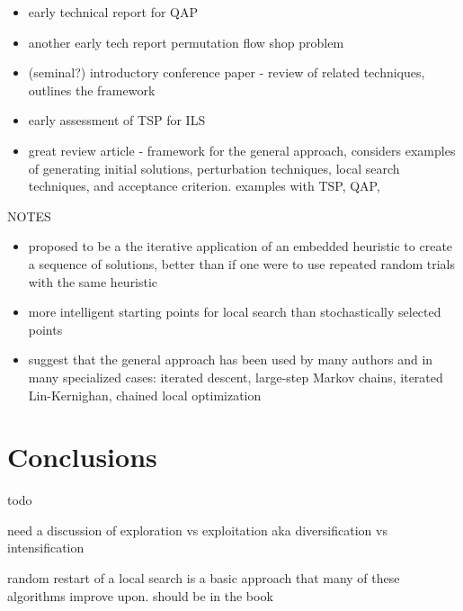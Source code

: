 \documentclass[a4paper, 11pt]{article}
\begin{document}
\begin{itemize}
	\item early technical report \cite{Stuetzle1999} for QAP
	\item another early tech report \cite{Stutzle1998a} permutation flow shop problem
	\item (seminal?) introductory conference paper \cite{Lourenco2001} - review of related techniques, outlines the framework

	\item early assessment of TSP for ILS \cite{Stutzle1999}
\end{itemize}

\begin{itemize}
	\item great review article \cite{Ramalhinho-Lourenco2003} - framework for the general approach, considers examples of generating initial solutions, perturbation techniques, local search techniques, and acceptance criterion. examples with TSP, QAP, 
\end{itemize}

NOTES
\begin{itemize}
	\item proposed to be a the iterative application of an embedded heuristic to create a sequence of solutions, better than if one were to use repeated random trials with the same heuristic
	\item more intelligent starting points for local search than stochastically selected points
	\item \cite{Ramalhinho-Lourenco2003} suggest that the general approach has been used by many authors and in many specialized cases: iterated descent, large-step Markov chains, iterated Lin-Kernighan, chained local optimization

	
\end{itemize}

% 
% 
\section{Conclusions}
\label{sec:conclusions}
todo

need a discussion of exploration vs exploitation  aka diversification vs intensification

random restart of a local search is a basic approach that many of these algorithms improve upon. should be in the book 
\end{document}
